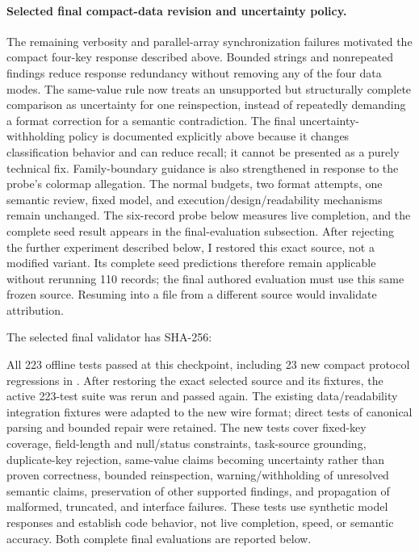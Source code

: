 \documentclass[11pt]{article}
\begin{document}
\paragraph{Selected final compact-data revision and uncertainty policy.}
The remaining verbosity and parallel-array synchronization failures
motivated the compact four-key response described above. Bounded strings
and nonrepeated findings reduce response redundancy without removing
any of the four data modes. The same-value rule now treats an unsupported
but structurally complete comparison as uncertainty for one reinspection,
instead of repeatedly demanding a format correction for a semantic
contradiction. The final uncertainty-withholding policy is documented
explicitly above because it changes classification behavior and can
reduce recall; it cannot be presented as a purely technical fix.
Family-boundary guidance is also strengthened in response to the probe's
colormap allegation. The normal budgets, two format attempts, one
semantic review, fixed model, and execution/design/readability mechanisms
remain unchanged. The six-record probe below measures live completion,
and the complete seed result appears in the final-evaluation subsection.
After rejecting the further experiment described below, I restored this
exact source, not a modified variant. Its complete seed predictions
therefore remain applicable without rerunning 110 records; the final
authored evaluation must use this same frozen source. Resuming into a
file from a different source would invalidate attribution.

The selected final validator has SHA-256:
\begin{quote}
\small
{}
\end{quote}
All 223 offline tests passed at this checkpoint, including 23 new compact
protocol regressions in .
After restoring the exact selected source and its fixtures, the active
223-test suite was rerun and passed again.
The existing data/readability integration fixtures were adapted to the
new wire format; direct tests of canonical parsing and bounded repair
were retained. The new tests cover fixed-key coverage, field-length and
null/status constraints, task-source grounding, duplicate-key rejection,
same-value claims becoming uncertainty rather than proven correctness,
bounded reinspection, warning/withholding of unresolved semantic claims,
preservation of other supported findings, and propagation of malformed,
truncated, and interface failures. These tests use synthetic model
responses and establish code behavior, not live completion, speed, or
semantic accuracy. Both complete final evaluations are reported below.
\end{document}
